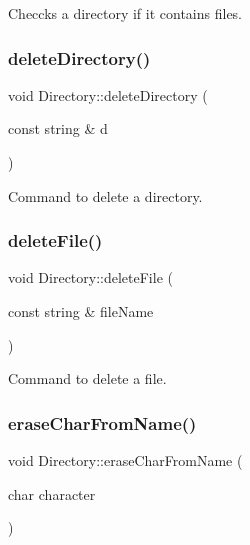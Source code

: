 Checcks a directory if it contains files. 

\mbox{\label{class_directory_a8d233286b4964b8261543fa823e66f9e}} 
\subsubsection{\texorpdfstring{delete\+Directory()}{deleteDirectory()}}
{\footnotesize\ttfamily void Directory\+::delete\+Directory (\begin{DoxyParamCaption}\item[{const string \&}]{d }\end{DoxyParamCaption})}



Command to delete a directory. 

\mbox{\label{class_directory_ac5d2847c135eff94ce4fedd8099de18a}} 
\subsubsection{\texorpdfstring{delete\+File()}{deleteFile()}}
{\footnotesize\ttfamily void Directory\+::delete\+File (\begin{DoxyParamCaption}\item[{const string \&}]{file\+Name }\end{DoxyParamCaption})}



Command to delete a file. 

\mbox{\label{class_directory_ad8718bf810510f06e1932a8083ae09e2}} 
\subsubsection{\texorpdfstring{erase\+Char\+From\+Name()}{eraseCharFromName()}}
{\footnotesize\ttfamily void Directory\+::erase\+Char\+From\+Name (\begin{DoxyParamCaption}\item[{char}]{character }\end{DoxyParamCaption})\hspace{0.3cm}{\ttfamily [inline]}}



